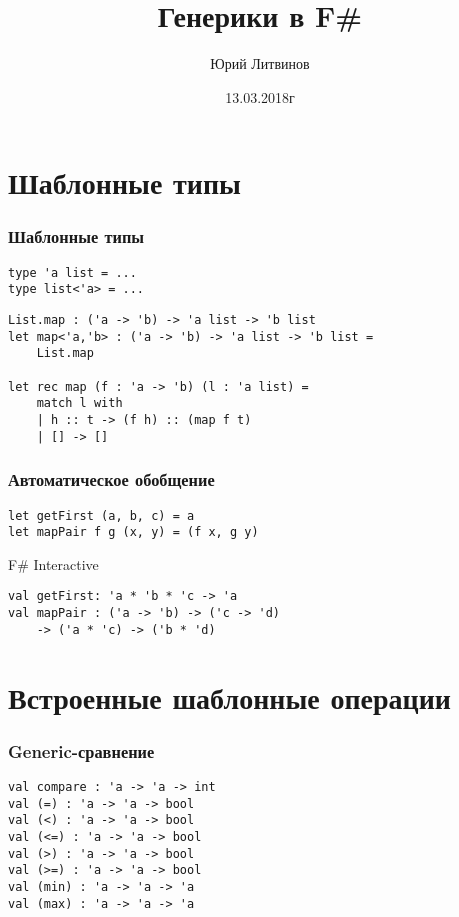 \documentclass[xetex,mathserif,serif]{beamer}
\title{Генерики в F\#}
\author{Юрий Литвинов}
\date{13.03.2018г}
\begin{document}
	
	\frame{\titlepage}
	
	\section{Шаблонные типы}
	
	\begin{frame}[fragile]
		\frametitle{Шаблонные типы}
		\begin{verbatim}
type 'a list = ...
type list<'a> = ...
		\end{verbatim}

		\begin{verbatim}
List.map : ('a -> 'b) -> 'a list -> 'b list
let map<'a,'b> : ('a -> 'b) -> 'a list -> 'b list = 
    List.map

let rec map (f : 'a -> 'b) (l : 'a list) =
    match l with
    | h :: t -> (f h) :: (map f t)
    | [] -> []
		\end{verbatim}
	\end{frame}

	\begin{frame}[fragile]
		\frametitle{Автоматическое обобщение}
		\begin{verbatim}
let getFirst (a, b, c) = a
let mapPair f g (x, y) = (f x, g y)
		\end{verbatim}

		\begin{alertblock}{F\# Interactive}
			\begin{verbatim}
val getFirst: 'a * 'b * 'c -> 'a
val mapPair : ('a -> 'b) -> ('c -> 'd) 
    -> ('a * 'c) -> ('b * 'd)
			\end{verbatim}
		\end{alertblock}
	\end{frame}
	
	\section{Встроенные шаблонные операции}

	\begin{frame}[fragile]
		\frametitle{Generic-сравнение}
		\begin{verbatim}
val compare : 'a -> 'a -> int
val (=) : 'a -> 'a -> bool
val (<) : 'a -> 'a -> bool
val (<=) : 'a -> 'a -> bool
val (>) : 'a -> 'a -> bool
val (>=) : 'a -> 'a -> bool
val (min) : 'a -> 'a -> 'a
val (max) : 'a -> 'a -> 'a
		\end{verbatim}
	\end{frame}
\end{document}

